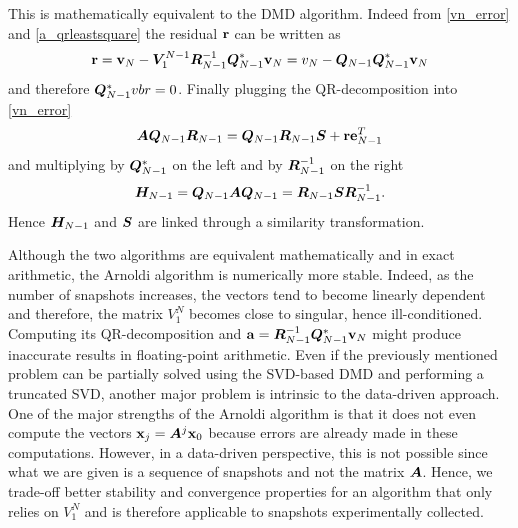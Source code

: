 This is mathematically equivalent to the DMD algorithm. Indeed from \eqref{vn_error} and \eqref{a_qrleastsquare} the residual $\vb{r}$ can be written as
\begin{equation*}
    \vb{r} = \vb{v}_N - \vb*{V}_1^{N-1}\vb*{R}_{N-1}^{-1}\vb*{Q}_{N-1}^*\vb{v}_N = v_N - \vb*{Q}_{N-1}\vb*{Q}_{N-1}^*\vb{v}_N
\end{equation*}
and therefore $\vb*{Q}_{N-1}^*vb{r} = 0$. Finally plugging the QR-decomposition into \eqref{vn_error}
\begin{equation*}
    \vb*{A}\vb*{Q}_{N-1}\vb*{R}_{N-1} = \vb*{Q}_{N-1}\vb*{R}_{N-1}\vb*{S} + \vb{r}\vb{e}_{N-1}^T
\end{equation*}
and multiplying by $\vb*{Q}_{N-1}^*$ on the left and by $\vb*{R}_{N-1}^{-1}$ on the right
\begin{equation}
    \label{similarity_arnoldi_dmd}
    \vb*{H}_{N-1} = \vb*{Q}_{N-1}\vb*{A}\vb*{Q}_{N-1} = \vb*{R}_{N-1}\vb*{S}\vb*{R}_{N-1}^{-1}.
\end{equation}
Hence $\vb*{H}_{N-1}$ and $\vb*{S}$ are linked through a similarity transformation.

Although the two algorithms are equivalent mathematically and in exact arithmetic, the Arnoldi algorithm is numerically more stable. Indeed, as the number of snapshots increases, the vectors tend to become linearly dependent and therefore, the matrix $V_1^N$ becomes close to singular, hence ill-conditioned. Computing its QR-decomposition and $\vb{a} = \vb*{R}_{N-1}^{-1} \vb*{Q}_{N-1}^*\vb{v}_N$ might produce inaccurate results in floating-point arithmetic. Even if the previously mentioned problem can be partially solved using the SVD-based DMD and performing a truncated SVD, another major problem is intrinsic to the data-driven approach. One of the major strengths of the Arnoldi algorithm is that it does not even compute the vectors $\vb{x}_j = \vb*{A}^j \vb{x}_0$ because errors are already made in these computations. However, in a data-driven perspective, this is not possible since what we are given is a sequence of snapshots and not the matrix $\vb*{A}$. Hence, we trade-off better stability and convergence properties for an algorithm that only relies on $V_1^N$ and is therefore applicable to snapshots experimentally collected.

